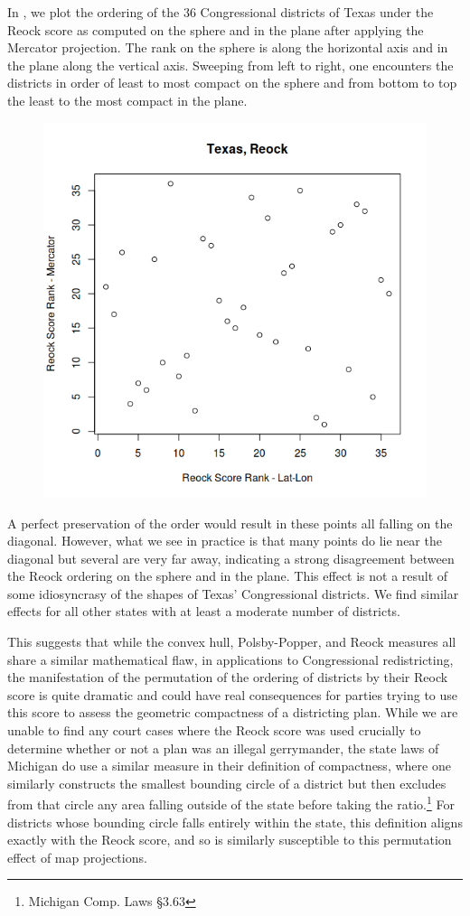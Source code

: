 In , we plot the ordering of the 36 Congressional districts of Texas under the Reock score as computed on the sphere and in the plane after applying the Mercator projection.  The rank on the sphere is along the horizontal axis and in the plane along the vertical axis.  Sweeping from left to right, one encounters the districts in order of least to most compact on the sphere and from bottom to top the least to the most compact in the plane.


		\begin{figure}[!h]
	\centering
	\includegraphics[width=.5\textwidth]{figs/texas_reock.png}

	\caption{}
	\label{fig:reock_exp_tx}
\end{figure}

A perfect preservation of the order would result in these points all falling on the diagonal.  However, what we see in practice is that many points do lie near the diagonal but several are very far away, indicating a strong disagreement between the Reock ordering on the sphere and in the plane.  This effect is not a result of some idiosyncrasy of the shapes of Texas' Congressional districts.  We find similar effects for all other states with at least a moderate number of districts.

This suggests that while the convex hull,  Polsby-Popper, and Reock measures all share a similar mathematical flaw, in applications to Congressional redistricting, the manifestation of the permutation of the ordering of districts by their Reock score is quite dramatic and could have real consequences for parties trying to use this score to assess the geometric compactness of a districting plan.  While we are unable to find any court cases where the Reock score was used crucially to determine whether or not a plan was an illegal gerrymander, the state laws of Michigan do use a similar measure in their definition of compactness, where one similarly constructs the smallest bounding circle of a district but then excludes from that circle any area falling outside of the state before taking the ratio.\footnote{Michigan Comp. Laws \S 3.63}  For districts whose bounding circle falls entirely within the state, this definition aligns exactly with the Reock score, and so is similarly susceptible to this permutation effect of map projections.



